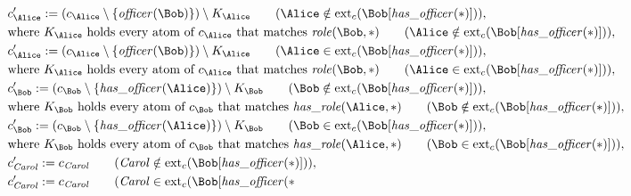 \begin{align*}
&
c'_
{
\Alice
}
 := 
(c_
{
\Alice
}
 \setminus 
\{
\mathit{\detokenize{
officer
}}
(
\Bob
)
\}
) \setminus K_
{
\Alice
}
 \qquad (
\Alice
 \notin 
\mathrm{ext}_c(
\Bob
[
\mathit{\detokenize{
has_officer
}}
(
\ast
)
]
)
)
,\\
&
\text{where } K_
{
\Alice
}
 \text{ holds every atom of } c_
{
\Alice
}
 \text{ that matches } 
\mathit{\detokenize{
role
}}
(
\Bob
,
\ast
)
 \qquad (
\Alice
 \notin 
\mathrm{ext}_c(
\Bob
[
\mathit{\detokenize{
has_officer
}}
(
\ast
)
]
)
)
,\\
&
c'_
{
\Alice
}
 := 
(c_
{
\Alice
}
 \setminus 
\{
\mathit{\detokenize{
officer
}}
(
\Bob
)
\}
) \setminus K_
{
\Alice
}
 \qquad (
\Alice
 \in 
\mathrm{ext}_c(
\Bob
[
\mathit{\detokenize{
has_officer
}}
(
\ast
)
]
)
)
,\\
&
\text{where } K_
{
\Alice
}
 \text{ holds every atom of } c_
{
\Alice
}
 \text{ that matches } 
\mathit{\detokenize{
role
}}
(
\Bob
,
\ast
)
 \qquad (
\Alice
 \in 
\mathrm{ext}_c(
\Bob
[
\mathit{\detokenize{
has_officer
}}
(
\ast
)
]
)
)
,\\
&
c'_
{
\Bob
}
 := 
(c_
{
\Bob
}
 \setminus 
\{
\mathit{\detokenize{
has_officer
}}
(
\Alice
)
\}
) \setminus K_
{
\Bob
}
 \qquad (
\Bob
 \notin 
\mathrm{ext}_c(
\Bob
[
\mathit{\detokenize{
has_officer
}}
(
\ast
)
]
)
)
,\\
&
\text{where } K_
{
\Bob
}
 \text{ holds every atom of } c_
{
\Bob
}
 \text{ that matches } 
\mathit{\detokenize{
has_role
}}
(
\Alice
,
\ast
)
 \qquad (
\Bob
 \notin 
\mathrm{ext}_c(
\Bob
[
\mathit{\detokenize{
has_officer
}}
(
\ast
)
]
)
)
,\\
&
c'_
{
\Bob
}
 := 
(c_
{
\Bob
}
 \setminus 
\{
\mathit{\detokenize{
has_officer
}}
(
\Alice
)
\}
) \setminus K_
{
\Bob
}
 \qquad (
\Bob
 \in 
\mathrm{ext}_c(
\Bob
[
\mathit{\detokenize{
has_officer
}}
(
\ast
)
]
)
)
,\\
&
\text{where } K_
{
\Bob
}
 \text{ holds every atom of } c_
{
\Bob
}
 \text{ that matches } 
\mathit{\detokenize{
has_role
}}
(
\Alice
,
\ast
)
 \qquad (
\Bob
 \in 
\mathrm{ext}_c(
\Bob
[
\mathit{\detokenize{
has_officer
}}
(
\ast
)
]
)
)
,\\
&
c'_
{
\mathit{Carol}
}
 := 
c_
{
\mathit{Carol}
}
 \qquad (
\mathit{Carol}
 \notin 
\mathrm{ext}_c(
\Bob
[
\mathit{\detokenize{
has_officer
}}
(
\ast
)
]
)
)
,\\
&
c'_
{
\mathit{Carol}
}
 := 
c_
{
\mathit{Carol}
}
 \qquad (
\mathit{Carol}
 \in 
\mathrm{ext}_c(
\Bob
[
\mathit{\detokenize{
has_officer
}}
(
\ast

\end{align*}
